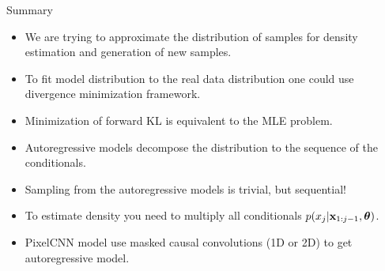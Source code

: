 \begin{frame}{Summary}
    \begin{itemize}
    	\item We are trying to approximate the distribution of samples for density estimation and generation of new samples.
    	\vfill
    	\item To fit model distribution to the real data distribution one could use divergence minimization framework.
    	\vfill
    	\item Minimization of forward KL is equivalent to the MLE problem.
    	\vfill
    	\item Autoregressive models decompose the distribution to the sequence of the conditionals.
    	 \vfill
        \item Sampling from the autoregressive models is trivial, but sequential!
        \vfill
        \item To estimate density you need to multiply all conditionals $p(x_j | \mathbf{x}_{1:j - 1}, \boldsymbol{\theta})$.
        \vfill
     	\item PixelCNN model use masked causal convolutions (1D or 2D) to get autoregressive model.
    \end{itemize}
\end{frame}

 